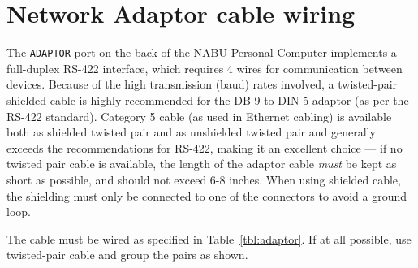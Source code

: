 
\section{Network Adaptor cable wiring}
The \texttt{ADAPTOR} port on the back of the NABU Personal Computer implements a full-duplex RS-422 interface, which requires 4 wires for communication between devices. Because of the high transmission (baud) rates involved, a twisted-pair shielded cable is highly recommended for the DB-9 to DIN-5 adaptor (as per the RS-422 standard). Category 5 cable (as used in Ethernet cabling) is available both as shielded twisted pair and as unshielded twisted pair and generally exceeds the recommendations for RS-422, making it an excellent choice --- if no twisted pair cable is available, the length of the adaptor cable \textit{must} be kept as short as possible, and should not exceed 6-8 inches. When using shielded cable, the shielding must only be connected to one of the connectors to avoid a ground loop.

The cable must be wired as specified in Table~\ref{tbl:adaptor}. If at all possible, use twisted-pair cable and group the pairs as shown.

